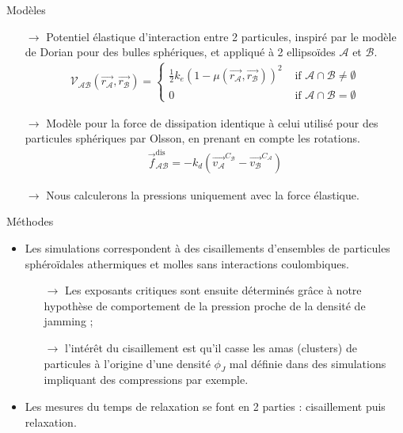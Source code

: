 \documentclass{beamer}
\begin{document}
\begin{frame}{Modèles}

\begin{itemize}
\item[$\rightarrow$] Potentiel élastique d'interaction entre 2 particules, inspiré par le modèle de Dorian pour des bulles sphériques, et appliqué à 2 ellipsoïdes $\mathcal{A}$ et $\mathcal{B}$.
\begin{align*}
\mathcal{V}_{\mathcal{A}\mathcal{B}}(\vec{r_{\mathcal{A}}},\vec{r_{\mathcal{B}}}) = \begin{cases} \frac{1}{2} k_e (1 - \mu(\vec{r_{\mathcal{A}}},\vec{r_{\mathcal{B}}}))^2 &\text{ if } \mathcal{A} \cap \mathcal{B} \neq \emptyset\\ 0 &\text{ if } \mathcal{A} \cap \mathcal{B} = \emptyset \end{cases}
\end{align*}
\item[$\rightarrow$] Modèle pour la force de dissipation identique à celui utilisé pour des particules sphériques par Olsson, en prenant en compte les rotations.
\begin{align*}
\vec{f}_{\mathcal{A}\mathcal{B}}^{\text{dis}} = -k_d(\vec{v_\mathcal{A}}^{C_\mathcal{B}} - \vec{v_\mathcal{B}}^{C_\mathcal{A}})
\end{align*}
\item[$\rightarrow$] Nous calculerons la pressions uniquement avec la force élastique.
\end{itemize}

\end{frame}

\begin{frame}{Méthodes}

\begin{itemize}
\item Les simulations correspondent à des cisaillements d’ensembles de particules sphéroïdales athermiques et molles sans interactions coulombiques.
    \begin{itemize}
	\item[$\rightarrow$] Les exposants critiques sont ensuite déterminés grâce à notre hypothèse de comportement de la pression proche de la densité de jamming ;
	\item[$\rightarrow$] l’intérêt du cisaillement est qu’il casse les amas (clusters) de particules à l’origine d’une densité $\phi_J$ mal définie dans des simulations impliquant des compressions par exemple.
	\end{itemize}
\item Les mesures du temps de relaxation se font en 2 parties : cisaillement puis relaxation.
\end{itemize}

\end{frame}
\end{document}
